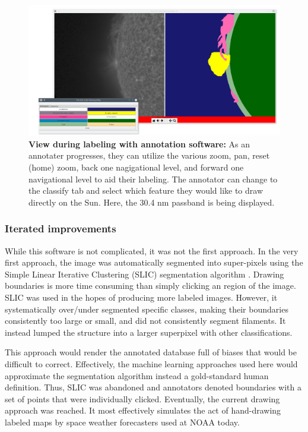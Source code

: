 \documentclass[twoside]{report}
\begin{document}
\begin{figure}[ht]
  \begin{center}
    \includegraphics[scale=0.25]{labeling-mid}
    \caption{{\bf View during labeling with annotation software:} As an annotater progresses, they can utilize the various zoom, pan, reset (home) zoom, back one nagigational level, and forward one navigational level to aid their labeling. The annotator can change to the classify tab and select which feature they would like to draw directly on the Sun. Here, the 30.4 nm passband is being displayed.}
    \label{fig:label-mid}
 \end{center}
\end{figure}

\subsubsection{Iterated improvements}
While this software is not complicated, it was not the first approach. In the very first approach, the image was automatically segmented into super-pixels using the Simple Linear Iterative Clustering (SLIC) segmentation algorithm \cite{SLIC}. Drawing boundaries is more time consuming than simply clicking an region of the image. SLIC was used in the hopes of producing more labeled images. However, it systematically over/under segmented specific classes, making their boundaries consistently too large or small, and did not consistently segment filaments. It instead lumped the structure into a larger superpixel with other classifications. 

This approach would render the annotated database full of biases that would be difficult to correct. Effectively, the machine learning approaches used here would approximate the segmentation algorithm instead a gold-standard human definition. Thus, SLIC was abandoned and annotators denoted boundaries with a set of points that were individually clicked. Eventually, the current drawing approach was reached. It most effectively simulates the act of hand-drawing labeled maps by space weather forecasters used at NOAA today. 
\end{document}
